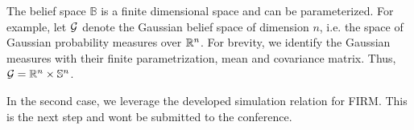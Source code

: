 \documentclass{ifacconf}
\newcommand{\red}[1]{{\color{red} #1}}
\begin{document}
 \noindent{\textbf{}}
The belief space $\mathbb{B}$ is  a finite dimensional space and can be parameterized. For example, let $\mathcal{G}$ denote the Gaussian belief space
    of dimension $n$, i.e. the space of Gaussian
    probability measures over $\mathbb{R}^n$.
    For brevity, we identify the Gaussian measures
    with their finite parametrization, mean and
    covariance matrix.
     Thus,
    $\mathcal{G} =  \mathbb{R}^n \times  \mathbb S^n$.
    
    
 
 In the second case, we leverage the developed simulation relation for FIRM. \red{This is the next step and wont be submitted to the conference. }
  





\end{document}
